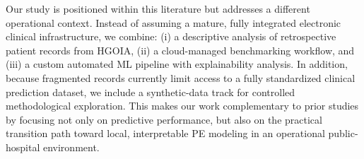 \documentclass[diagnostics,article,accept,pdftex,moreauthors]{Definitions/mdpi}
\begin{document}
Our study is positioned within this literature but addresses a
different operational context. Instead of assuming a mature,
fully integrated electronic clinical infrastructure, we combine: (i)
a descriptive analysis of retrospective patient records from \ac{HGOIA}, (ii) a cloud-managed benchmarking workflow, and (iii) a
custom automated \ac{ML} pipeline with explainability analysis. In
addition, because fragmented records currently limit access to a fully
standardized clinical prediction dataset, we include a synthetic-data
track for controlled methodological exploration. This makes our work
complementary to prior studies by focusing not only on predictive
performance, but also on the practical transition path toward local,
interpretable \ac{PE} modeling in an operational public-hospital
environment.





\end{document}
